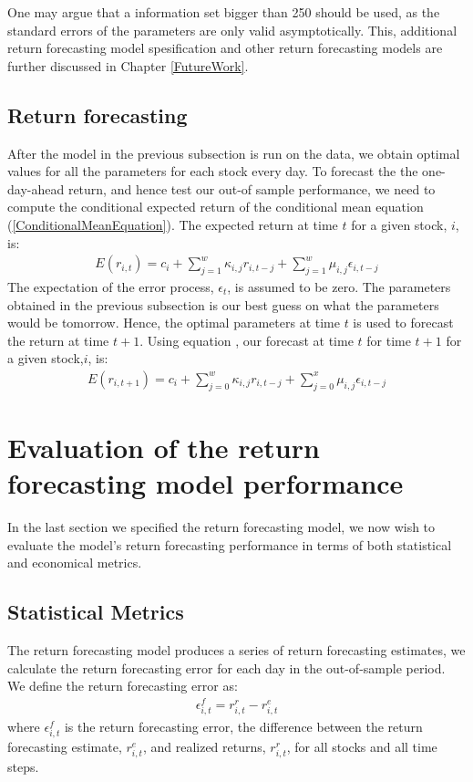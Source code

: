 One may argue that a information set bigger than 250 should be used, as the standard errors of the parameters are only valid asymptotically. This, additional return forecasting model spesification and other return forecasting models are further discussed in Chapter \ref{FutureWork}.


\subsection{Return forecasting}

After the model in the previous subsection is run on the data, we obtain optimal values for all the parameters for each stock every day. To forecast the the one-day-ahead return, and hence test our out-of sample performance, we need to compute the conditional expected return of the conditional mean equation (\ref{ConditionalMeanEquation}). The expected return at time $t$ for a given stock, $i$, is:
\begin{align} 
    E(r_{i,t})=c_i+\sum_{j=1}^w\kappa_{i,j} r_{i,t-j}+\sum_{j=1}^w\mu_{i,j} \epsilon_{i,t-j} \label{ExpectedConditionalMean}
\end{align}
The expectation of the error process, $\epsilon_t$, is assumed to be zero. The parameters obtained in the previous subsection is our best guess on what the parameters would be tomorrow. Hence, the optimal parameters at time $t$ is used to forecast the return at time $t+1$. Using equation \label{ExpectedConditionalMean}, our forecast at time $t$ for time $t+1$ for a given stock,$i$, is:
\begin{align} 
    E(r_{i,t+1})=c_i+\sum_{j=0}^w\kappa_{i,j} r_{i,t-j}+\sum_{j=0}^x\mu_{i,j} \epsilon_{i,t-j}
\end{align}

\section{Evaluation of the return forecasting model performance}
In the last section we specified the return forecasting model, we now wish to evaluate the model's return forecasting performance in terms of both statistical and economical metrics. 

\subsection{Statistical Metrics}

The return forecasting model produces a series of return forecasting estimates, we calculate the return forecasting error for each day in the out-of-sample period. We define the return forecasting error as:
\begin{align}
    \epsilon_{i,t}^{f} = r_{i,t}^{r} - r_{i,t}^{e}
\end{align}
where $\epsilon_{i,t}^{f}$ is the return forecasting error, the difference between the return forecasting estimate, $r_{i,t}^{e}$, and realized returns, $r_{i,t}^{r}$, for all stocks and all time steps.

